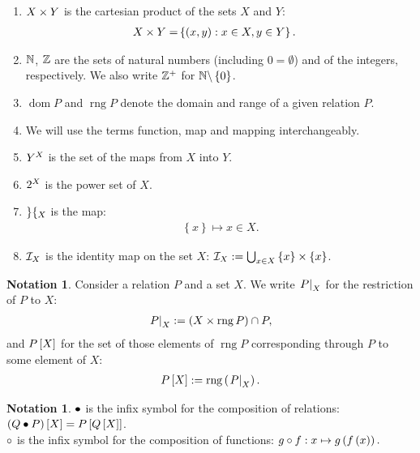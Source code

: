 \documentclass[oneside
]
{article}
\theoremstyle{plain}
\theoremstyle{definition}
\newtheorem{Not}[Cor]{Notation}
\DeclareMathOperator{\rng}{rng}
\DeclareMathOperator{\dom}{dom}
\begin{document}
\label{RefNotationZero}
\hfill
\begin{enumerate}
\item
$X \cartprod Y$ is the cartesian product of the sets $X$ and $Y$:
\begin{align*}
X \cartprod Y = & \left\{ \pair{x}{y}: x \in X, y \in Y \right\}.
\end{align*}
\item
$\N$, $\Z$ are the sets of natural numbers (including $0 = \emptyset$) and of the integers, respectively. We also write $\Z^+$ for $\N \sdiff \left\{ 0 \right\}$.
\item
$\dom P$ and $\rng P$ denote the domain and range of a given relation $P$.
\item
We will use the terms function, map and mapping interchangeably.
\item
\label{RefEq31}
$\mapsFromTo{X}{Y}$ is the set of the maps from $X$ into $Y$.
\item
$\powset{X}$ is the power set of $X$.
\item
$\peel{X}$ is the map: 
\begin{align*}
\left\{ x \right\} \mapsto x \in X.
\end{align*}
\item
$\id{X}$ is the identity map on the set $X$: $\id{X} := \U_{x \in X} \left\{ x \right\} \cartprod \left\{ x \right\}$.
\end{enumerate}

\begin{Not}
Consider a relation $P$ and a set $X$. 
We write
$ \restrict{P}{X}$ for the restriction of $P$ to $X$:
\begin{align*}
\restrict{P}{X} := \left( X \cartprod \rng P \right) \cap P,
\end{align*}
and 
$\im{P}{X}$ for the set of those  elements of $\rng{P}$ corresponding through $P$ to some element of $X$:
\begin{align*}
\im{P}{X} := \rng \left( \restrict{P}{X} \right).
\end{align*}
\end{Not}

\begin{Not}
\label{RefNotationCompositions}
$\relcomp$ is the infix symbol for the composition of relations:
$ \im{\left( Q \relcomp P \right)}{X} = \im{P}{\im{Q}{X}} $.
\\
$\funccomp$ is the infix symbol for the composition of functions:
$ g \funccomp f: x \mapsto g \left( f \left( x \right) \right).$
\end{Not}
\end{document}
